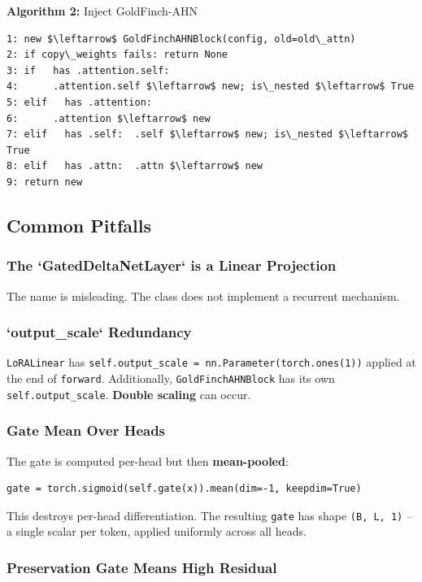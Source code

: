 \textbf{Algorithm 2:} Inject GoldFinch-AHN
\begin{lstlisting}
1: new $\leftarrow$ GoldFinchAHNBlock(config, old=old\_attn)
2: if copy\_weights fails: return None
3: if   has .attention.self:
4:      .attention.self $\leftarrow$ new; is\_nested $\leftarrow$ True
5: elif   has .attention:
6:      .attention $\leftarrow$ new
7: elif   has .self:  .self $\leftarrow$ new; is\_nested $\leftarrow$ True
8: elif   has .attn:  .attn $\leftarrow$ new
9: return new
\end{lstlisting}

\subsection{Common Pitfalls}

\subsubsection{The `GatedDeltaNetLayer` is a Linear Projection}

The name is misleading. The class does not implement a recurrent mechanism.

\subsubsection{`output\_scale` Redundancy}

\texttt{LoRALinear} has \texttt{self.output\_scale = nn.Parameter(torch.ones(1))} applied 
at the end of \texttt{forward}. Additionally, \texttt{GoldFinchAHNBlock} has its own 
\texttt{self.output\_scale}. \textbf{Double scaling} can occur.

\subsubsection{Gate Mean Over Heads}

The gate is computed per-head but then \textbf{mean-pooled}:

\begin{lstlisting}
gate = torch.sigmoid(self.gate(x)).mean(dim=-1, keepdim=True)
\end{lstlisting}

This destroys per-head differentiation. The resulting \texttt{gate} has shape 
\texttt{(B, L, 1)} -- a single scalar per token, applied uniformly across all heads.

\subsubsection{Preservation Gate Means High Residual}


